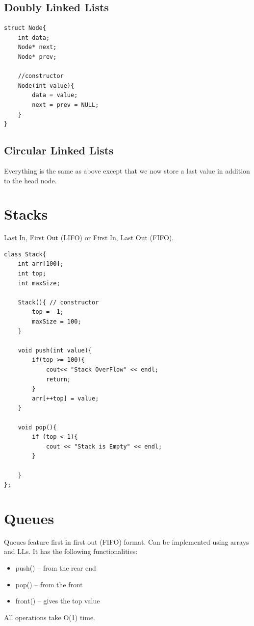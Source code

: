 \documentclass[11pt]{article}
\begin{document}
\subsection{Doubly Linked Lists}
\begin{minipage}{\linewidth}
\begin{lstlisting}
struct Node{
	int data;
	Node* next;
	Node* prev;

	//constructor
	Node(int value){
		data = value;
		next = prev = NULL;
	}
}
\end{lstlisting}
\end{minipage}

\subsection{Circular Linked Lists}
Everything is the same as above except that we now store a last value in addition to the head node.

\section{Stacks}
Last In, First Out (LIFO) or First In, Last Out (FIFO).

\begin{minipage}{\linewidth}
\begin{lstlisting}
class Stack{
	int arr[100];
	int top;
	int maxSize;

	Stack(){ // constructor
		top = -1;
		maxSize = 100;
	}

	void push(int value){
		if(top >= 100){
			cout<< "Stack OverFlow" << endl;
			return;
		}
		arr[++top] = value;
	}

	void pop(){
		if (top < 1){
			cout << "Stack is Empty" << endl;
		}
		
	}
};
\end{lstlisting}
\end{minipage}

\section{Queues}

Queues feature first in first out (FIFO) format. Can be implemented using arrays and LLs. It has the following functionalities:
\begin{itemize}
    \item push() -- from the rear end
    \item pop() -- from the front
    \item front() -- gives the top value
\end{itemize}
All operations take O(1) time.
\end{document}
